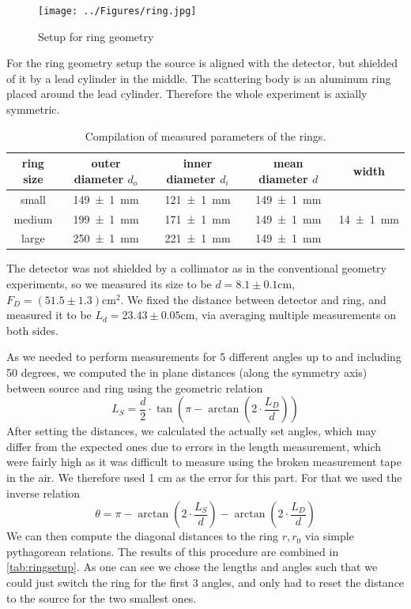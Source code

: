 \documentclass[a4paper,12pt]{article}
\begin{document}
\begin{figure}[H]
	\centering
	\texttt{[image: ../Figures/ring.jpg]}
	\caption{Setup for ring geometry}
	\label{setCalib}
\end{figure}

For the ring geometry setup the source is aligned with the detector, but shielded of it by a lead cylinder in the middle. The scattering body is an aluminum ring placed around the lead cylinder. Therefore the whole experiment is axially symmetric.

\begin{table}[H]
	\renewcommand{\arraystretch}{1.5}
	\centering
	\begin{tabular}{|c|c|c|c|c|}
		\hline
		ring size & outer diameter $d_o$ & inner diameter $d_i$ & mean diameter $d$ & width\\
		\hline
		small & \SI{149+-1}{mm} & \SI{121+-1}{mm} & \SI{149+-1}{mm} & \multirow{3}{*}{\SI{14+-1}{mm}} \\
		\cline{1-4}
		medium & \SI{199+-1}{mm} & \SI{171+-1}{mm} & \SI{149+-1}{mm} & \\
		\cline{1-4}
		large & \SI{250+-1}{mm} & \SI{221+-1}{mm} & \SI{149+-1}{mm} & \\
		\hline
	\end{tabular}
	\caption{Compilation of measured parameters of the rings. }
	\label{tab:rings }
\end{table}

The detector was not shielded by a collimator as in the conventional geometry experiments, so we measured its size to be $d = 8.1 \pm 0.1$cm, $F_D = (51.5\pm1.3)\si{\centi\meter\squared}$. We fixed the distance between detector and ring, and measured it to be $L_d = 23.43 \pm 0.05$cm, via averaging multiple measurements on both sides.

As we needed to perform measurements for 5 different angles up to and including 50 degrees, we computed the in plane distances (along the symmetry axis) between source and ring using the geometric relation
\begin{equation}
	L_S = \frac{d}{2} \cdot \tan{\left( \pi - \arctan{\left( 2 \cdot \frac{L_D}{d} \right)} \right)}
\end{equation}
After setting the distances, we calculated the actually set angles, which may differ from the expected ones due to errors in the length measurement, which were fairly high as it was difficult to measure using the broken measurement tape in the air. We therefore used 1 cm as the error for this part. For that we used the inverse relation
\begin{equation}
	\theta = \pi - \arctan{\left( 2 \cdot \frac{L_S}{d} \right)} - \arctan{\left( 2 \cdot \frac{L_D}{d} \right)}
\end{equation}
We can then compute the diagonal distances to the ring $r, r_0$ via simple pythagorean relations. The results of this procedure are combined in \cref{tab:ringsetup}. As one can see we chose the lengths and angles such that we could just switch the ring for the first 3 angles, and only had to reset the distance to the source for the two smallest ones.
\end{document}

